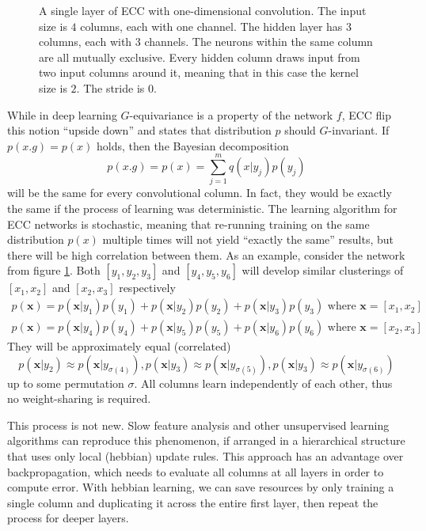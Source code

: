 \documentclass[12pt]{article}
\begin{document}
\begin{figure}[!htbp]
	\caption{A single layer of ECC with one-dimensional convolution. The input size is $4$ columns, each with one channel. The hidden layer has $3$ columns, each with $3$ channels. The neurons within the same column are all mutually exclusive. Every hidden column draws input from two input columns around it, meaning that in this case the kernel size is $2$. The stride is $0$. }
	\label{fig:ecc_conv_machine}
\end{figure} 
While in deep learning $G$-equivariance is a property of the network $f$, ECC flip this notion ``upside down'' and states that distribution $p$ should $G$-invariant. If $p(x.g)=p(x)$ holds, then the Bayesian decomposition
\[
p(x.g) = p(x) = \sum_{j=1}^m q(x|y_j)p(y_j)  
\]
will be the same for every convolutional column. In fact, they would be exactly the same if the process of learning was deterministic. The learning algorithm for ECC networks is stochastic, meaning that re-running training on the same distribution $p(x)$ multiple times will not yield ``exactly the same'' results, but there will be high correlation between them.
As an example, consider the network from figure \ref{fig:ecc_conv_machine}. Both $[y_1,y_2,y_3]$ and $[y_4,y_5,y_6]$ will develop similar clusterings of $[x_1,x_2]$ and $[x_2,x_3]$ respectively
\begin{gather*}
	p(\boldsymbol{x}) = p(\boldsymbol{x}|y_1)p(y_1)+  p(\boldsymbol{x}|y_2)p(y_2)+  p(\boldsymbol{x}|y_3)p(y_3)\text{ where }\boldsymbol{x}=[x_1,x_2] \\
	p(\boldsymbol{x}) = p(\boldsymbol{x}|y_4)p(y_4)+  p(\boldsymbol{x}|y_5)p(y_5)+  p(\boldsymbol{x}|y_6)p(y_6)\text{ where }\boldsymbol{x}=[x_2,x_3]
\end{gather*}
They will be approximately equal  (correlated)
\[p(\boldsymbol{x}|y_2) \approx p(\boldsymbol{x}|y_{\sigma(4)}), p(\boldsymbol{x}|y_{3}) \approx p(\boldsymbol{x}|y_{\sigma(5)}),p(\boldsymbol{x}|y_3) \approx p(\boldsymbol{x}|y_{\sigma(6)})\]
up to some permutation $\sigma$. All columns learn independently of each other, thus no weight-sharing is required.

This process is not new. Slow feature analysis and other unsupervised learning algorithms can reproduce this phenomenon, if arranged in a hierarchical structure that uses only local (hebbian) update rules. This approach has an advantage over backpropagation, which needs to evaluate all columns at all layers in order to compute error. With hebbian learning, we can save resources by only training a single column and  duplicating it across the entire first layer, then repeat the process for deeper layers.
\end{document}

